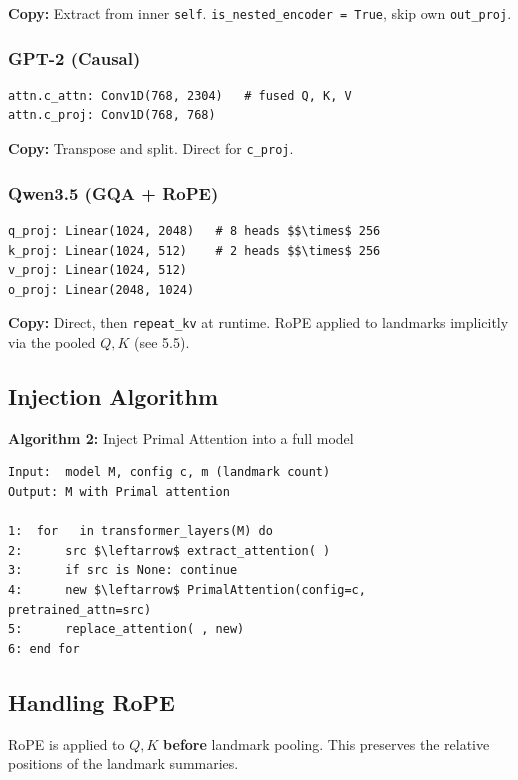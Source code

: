 \textbf{Copy:} Extract from inner \texttt{self}. \texttt{is\_nested\_encoder = True}, skip own 
\texttt{out\_proj}.

\subsubsection{GPT-2 (Causal)}

\begin{lstlisting}
attn.c_attn: Conv1D(768, 2304)   # fused Q, K, V
attn.c_proj: Conv1D(768, 768)
\end{lstlisting}

\textbf{Copy:} Transpose and split. Direct for \texttt{c\_proj}.

\subsubsection{Qwen3.5 (GQA + RoPE)}

\begin{lstlisting}
q_proj: Linear(1024, 2048)   # 8 heads $$\times$ 256
k_proj: Linear(1024, 512)    # 2 heads $$\times$ 256
v_proj: Linear(1024, 512)
o_proj: Linear(2048, 1024)
\end{lstlisting}

\textbf{Copy:} Direct, then \texttt{repeat\_kv} at runtime. RoPE applied to landmarks 
implicitly via the pooled $Q, K$ (see  5.5).

\subsection{Injection Algorithm}

\textbf{Algorithm 2:} Inject Primal Attention into a full model
\begin{lstlisting}
Input:  model M, config c, m (landmark count)
Output: M with Primal attention

1:  for   in transformer_layers(M) do
2:      src $\leftarrow$ extract_attention( )
3:      if src is None: continue
4:      new $\leftarrow$ PrimalAttention(config=c, pretrained_attn=src)
5:      replace_attention( , new)
6: end for
\end{lstlisting}

\subsection{Handling RoPE}

RoPE is applied to $Q, K$ \textbf{before} landmark pooling. This preserves the 
relative positions of the landmark summaries.

